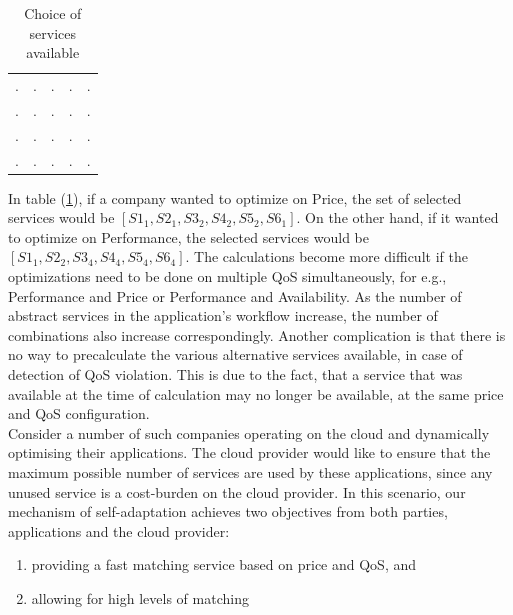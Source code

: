 \documentclass[10pt,journal,compsoc]{IEEEtran}
\begin{document}
\begin{table}
\begin{tabular}{| c | c | c | c | c |}
. & . & . & . & .\\ 
. & . & . & . & .\\
. & . & . & . & .\\
. & . & . & . & .\\ \hline

\hline
 
\end{tabular}
\caption{Choice of services available}
\label{choice-of-services}
\end{table}
 
 In table (\ref{choice-of-services}), if a company wanted to optimize on Price, the set of selected services would be $[S1_{1}, S2_{1}, S3_{2}, S4_{2}, S5_{2}, S6_{1}]$. On the other hand, if it wanted to optimize on Performance, the selected services would be $[S1_{1}, S2_{2}, S3_{4}, S4_{4}, S5_{4}, S6_{4}]$. The calculations become more difficult if the optimizations need to be done on multiple QoS simultaneously, for e.g., Performance and Price or Performance and Availability. As the number of abstract services in the application's workflow increase, the number of combinations also increase correspondingly.
Another complication is that there is no way to precalculate the various alternative services available, in case of detection of QoS violation. This is due to the fact, that a service that was available at the time of calculation may no longer be available, at the same price and QoS configuration.\\
Consider a number of such companies operating on the cloud and dynamically optimising their applications. The cloud provider would like to ensure that the maximum possible number of services are used by these applications, since any unused service is a cost-burden on the cloud provider. In this scenario, our mechanism of self-adaptation achieves two objectives from both parties, applications and the cloud provider:
	\begin{enumerate}
	    \item providing a fast matching service based on price and QoS, and
	    \item allowing for high levels of matching 
	\end{enumerate}
\end{document}
